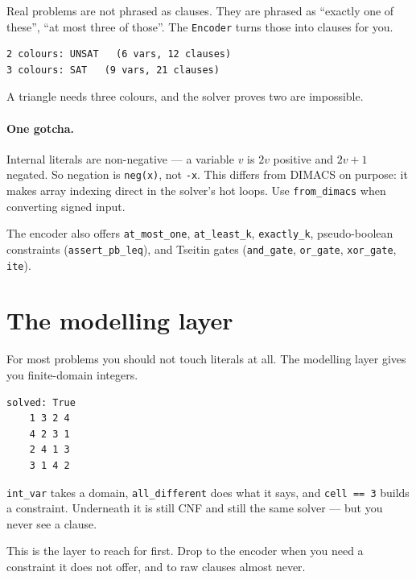 \documentclass[11pt,a4paper]{article}
\begin{document}
Real problems are not phrased as clauses. They are phrased as ``exactly one of
these'', ``at most three of those''. The \texttt{Encoder} turns those into
clauses for you.



\begin{lstlisting}[style=out]
2 colours: UNSAT   (6 vars, 12 clauses)
3 colours: SAT   (9 vars, 21 clauses)
\end{lstlisting}

A triangle needs three colours, and the solver proves two are impossible.

\paragraph{One gotcha.} Internal literals are non-negative --- a variable $v$
is $2v$ positive and $2v{+}1$ negated. So negation is \texttt{neg(x)}, not
\texttt{-x}. This differs from DIMACS on purpose: it makes array indexing
direct in the solver's hot loops. Use \texttt{from\_dimacs} when converting
signed input.

The encoder also offers \texttt{at\_most\_one}, \texttt{at\_least\_k},
\texttt{exactly\_k}, pseudo-boolean constraints
(\texttt{assert\_pb\_leq}), and Tseitin gates (\texttt{and\_gate},
\texttt{or\_gate}, \texttt{xor\_gate}, \texttt{ite}).

\section{The modelling layer}

For most problems you should not touch literals at all. The modelling layer
gives you finite-domain integers.



\begin{lstlisting}[style=out]
solved: True
    1 3 2 4
    4 2 3 1
    2 4 1 3
    3 1 4 2
\end{lstlisting}

\texttt{int\_var} takes a domain, \texttt{all\_different} does what it says,
and \texttt{cell == 3} builds a constraint. Underneath it is still CNF and
still the same solver --- but you never see a clause.

This is the layer to reach for first. Drop to the encoder when you need a
constraint it does not offer, and to raw clauses almost never.
\end{document}
